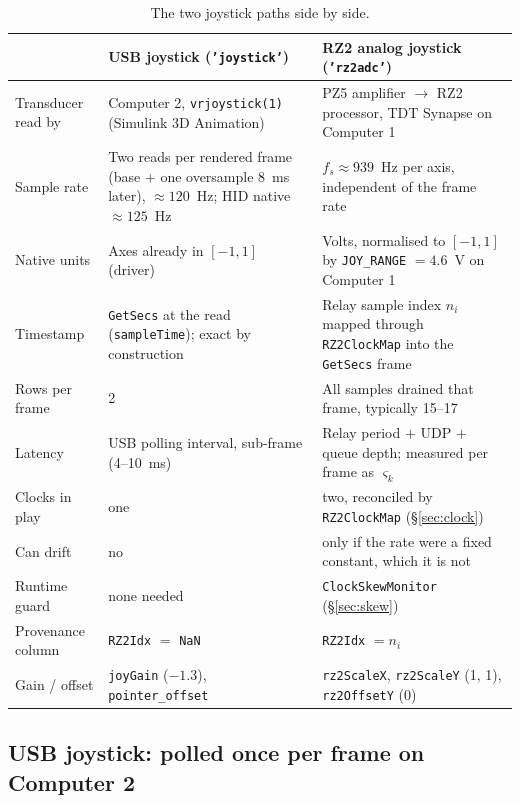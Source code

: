 \documentclass[11pt,a4paper]{article}
\newcommand{\code}[1]{\texttt{\small #1}}
\begin{document}
\begin{table}[htbp]
\centering
\small
\begin{tabular}{@{}P{3.0cm}P{5.4cm}P{6.5cm}@{}}
\toprule
 & USB joystick (\code{'joystick'}) & RZ2 analog joystick (\code{'rz2adc'}) \\
\midrule
Transducer read by & Computer 2, \code{vrjoystick(1)} (Simulink 3D Animation) &
  PZ5 amplifier $\rightarrow$ RZ2 processor, TDT Synapse on Computer 1 \\[2pt]
Sample rate & Two reads per rendered frame (base $+$ one oversample 8~ms
  later), $\approx 120$~Hz; HID native $\approx 125$~Hz &
  $f_s \approx 939$~Hz per axis, independent of the frame rate \\[2pt]
Native units & Axes already in $[-1,1]$ (driver) &
  Volts, normalised to $[-1,1]$ by \code{JOY\_RANGE} $= 4.6$~V on Computer 1 \\[2pt]
Timestamp & \code{GetSecs} at the read (\code{sampleTime}); exact by
  construction & Relay sample index $n_i$ mapped through \code{RZ2ClockMap}
  into the \code{GetSecs} frame \\[2pt]
Rows per frame & 2 & All samples drained that frame, typically 15--17 \\[2pt]
Latency & USB polling interval, sub-frame (4--10~ms) &
  Relay period $+$ UDP $+$ queue depth; measured per frame as $\varsigma_k$ \\[2pt]
Clocks in play & one & two, reconciled by \code{RZ2ClockMap} (\S\ref{sec:clock}) \\[2pt]
Can drift & no & only if the rate were a fixed constant, which it is not \\[2pt]
Runtime guard & none needed & \code{ClockSkewMonitor} (\S\ref{sec:skew}) \\[2pt]
Provenance column & \code{RZ2Idx} $=$ \code{NaN} & \code{RZ2Idx} $= n_i$ \\[2pt]
Gain / offset & \code{joyGain} ($-1.3$), \code{pointer\_offset} &
  \code{rz2ScaleX}, \code{rz2ScaleY} (1, 1), \code{rz2OffsetY} (0) \\
\bottomrule
\end{tabular}
\caption{The two joystick paths side by side.}
\label{tab:paths}
\end{table}

\subsection{USB joystick: polled once per frame on Computer 2}
\end{document}

